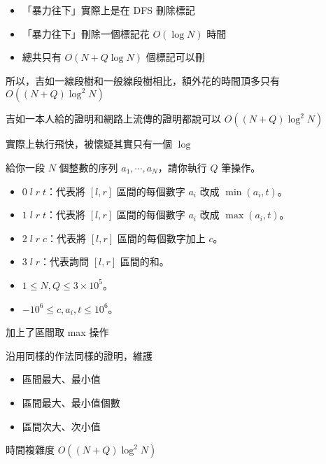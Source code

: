 \begin{frame}{}
    \begin{itemize}
        \item 「暴力往下」實際上是在 DFS 刪除標記
        \item 「暴力往下」刪除一個標記花 $O(\log N)$ 時間
        \item 總共只有 $O(N + Q \log N)$ 個標記可以刪
    \end{itemize}

    所以，吉如一線段樹和一般線段樹相比，額外花的時間頂多只有 $O((N + Q) \log^2 N)$
\end{frame}

\begin{frame}{}
    吉如一本人給的證明和網路上流傳的證明都說可以 $O((N + Q) \log^2 N)$

    實際上執行飛快，被懷疑其實只有一個 $\log$
\end{frame}

\begin{frame}{}
    \begin{problem}
        給你一段 $N$ 個整數的序列 $a_1,\cdots,a_N$，請你執行 $Q$ 筆操作。

        \begin{itemize}
            \item $0\;l\;r\;t$：代表將 $[l,r]$ 區間的每個數字 $a_i$ 改成 $\min(a_i,t)$。
            \item $1\;l\;r\;t$：代表將 $[l,r]$ 區間的每個數字 $a_i$ 改成 $\max(a_i,t)$。
            \item $2\;l\;r\;c$：代表將 $[l,r]$ 區間的每個數字加上 $c$。
            \item $3\;l\;r$：代表詢問 $[l,r]$ 區間的和。
        \end{itemize}
        
        \begin{itemize}
            \item $1\le N,Q\le 3\times 10^5$。
            \item $-10^6\le c,a_i,t\le 10^6$。
        \end{itemize}
    \end{problem}
\end{frame}

\begin{frame}{}
    加上了區間取 max 操作

    沿用同樣的作法同樣的證明，維護

    \begin{itemize}
        \item 區間最大、最小值
        \item 區間最大、最小值個數
        \item 區間次大、次小值
    \end{itemize}

    時間複雜度 $O((N + Q) \log^2 N)$
\end{frame}


